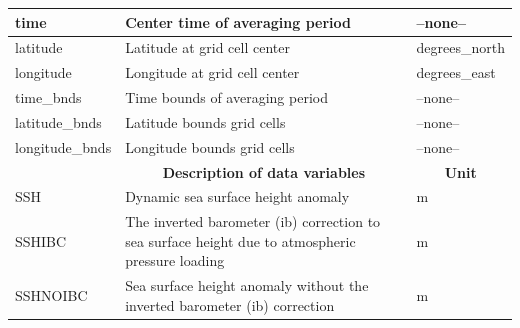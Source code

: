 \begin{longtable}{|m{}|m{}|m{}|}
time &Center time of averaging period &--none--  \\ \hline
latitude &Latitude at grid cell center &degrees\_north  \\ \hline
longitude &Longitude at grid cell center &degrees\_east  \\ \hline
time\_bnds &Time bounds of averaging period &--none--  \\ \hline
latitude\_bnds &Latitude bounds grid cells &--none--  \\ \hline
longitude\_bnds &Longitude bounds grid cells &--none--  \\ \hline
\rowcolor{lightgray} \multicolumn{1}{|c|}{\textbf{Variables}} & \multicolumn{1}{|c|}{\textbf{Description of data variables}} &  \multicolumn{1}{|c|}{\textbf{Unit}}\\ \hline
SSH &Dynamic sea surface height anomaly &m  \\ \hline
SSHIBC &The inverted barometer (ib) correction to sea surface height due to atmospheric pressure loading &m  \\ \hline
SSHNOIBC &Sea surface height anomaly without the inverted barometer (ib) correction &m  \\ \hline
\end{longtable}

\newp
\pagebreak
